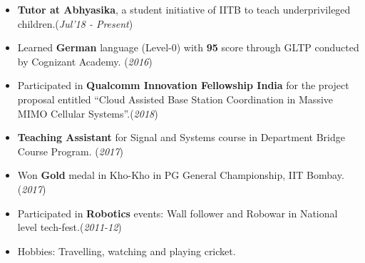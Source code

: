 \documentclass[10pt]{article}
\begin{document}
\begin{itemize}[leftmargin=0.4cm]
\item \textbf{Tutor at Abhyasika}, a student initiative of IITB to teach underprivileged children.\hfill{(\textit{Jul'18 - Present})}\vspace{-0.2cm}
    	
\end{itemize}
\vspace{0.15cm}

\colorbox{bl}{}
\vspace{-0.45cm}
\begin{itemize}[leftmargin=0.4cm]
    \item {Learned \textbf{German} language (Level-0) with \textbf{95} score through GLTP conducted by Cognizant Academy. }\hfill{(\textit{2016})}\vspace{-0.2cm}
    \item {Participated in \textbf{Qualcomm Innovation Fellowship India} for the project proposal entitled \enquote{Cloud Assisted Base Station Coordination in Massive MIMO Cellular Systems}}.\hfill{(\textit{2018})}\vspace{-0.2cm}
    \item \textbf{Teaching Assistant} for Signal and Systems course in Department Bridge Course Program. \hfill{(\textit{2017})}\vspace{-0.2cm}
    \item {Won \textbf{Gold} medal in Kho-Kho in PG General Championship, IIT Bombay.}\hfill{(\textit{2017})}\vspace{-0.2cm}
    \item {Participated in \textbf{Robotics} events: Wall follower and Robowar in National level tech-fest.}\hfill{(\textit{2011-12})}\vspace{-0.2cm}
    \item {Hobbies: Travelling, watching and playing cricket.}

    
\end{itemize}

\end{document}

